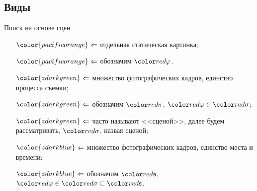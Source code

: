 
\subsection{Виды}

\begin{frame}[allowframebreaks]{Поиск на основе сцен}

    {\footnotesize
        \begin{itemize}
            \item[${\color{pacificorange} \Leftarrow}$]
                отдельная статическая картинка;
            \item[${\color{pacificorange} \Leftarrow}$]
                обозначим $\videoframe$.
        \end{itemize}
    }

    \vspace{12pt}
    {\footnotesize
        \begin{itemize}
            \item[${\color{zdarkgreen} \Leftarrow}$]
                множество фотографических кадров,
                единство процесса съемки;
            \item[${\color{zdarkgreen} \Leftarrow}$]
                обозначим $\videoshot$,
                $\videoframe \in \videoshot$;
            \item[${\color{zdarkgreen} \Leftarrow}$]
                часто называют <<сценой>>, 
                далее будем рассматривать, $\videoshot$, назвая сценой;
        \end{itemize}
    }
    \vspace{12pt}
    {\footnotesize
        \begin{itemize}
            \item[${\color{zdarkblue} \Leftarrow}$]
                множество фотографических кадров,
                единство места и времени;
            \item[${\color{zdarkblue} \Leftarrow}$]
                обозначим $\videoscene$,
                $\videoframe \in \videoshot \subset \videoscene$.
        \end{itemize}
    }


\end{frame}
